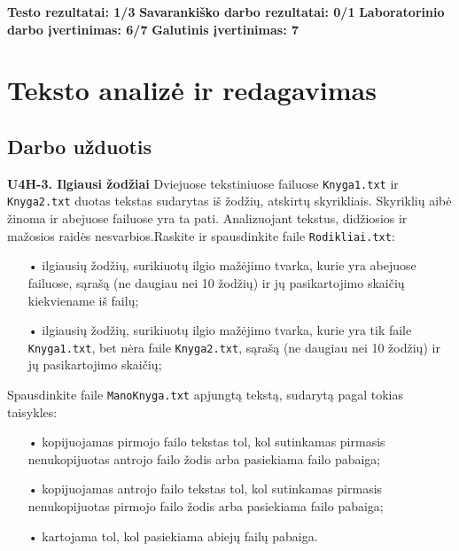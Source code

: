 \documentclass{article}
\def\changemargin#1#2{\list{}{\rightmargin#2\leftmargin#1}\item[]}
\begin{document}
\changemargin{0cm}{0cm}\textbf{Testo rezultatai: 1/3}\newline
\textbf{Savarankiško darbo rezultatai: 0/1}\newline
\textbf{Laboratorinio darbo įvertinimas: 6/7}\newline
\textbf{Galutinis įvertinimas: 7}\newline

\newpage


\section{Teksto analizė ir redagavimas}
\subsection{Darbo užduotis}
\textbf{U4H-3. Ilgiausi žodžiai}\newline
Dviejuose  tekstiniuose  failuose \texttt{Knyga1.txt} ir \texttt{Knyga2.txt} duotas tekstas sudarytas iš žodžių,
atskirtų skyrikliais. Skyriklių aibė žinoma ir abejuose failuose yra ta pati. Analizuojant tekstus, didžiosios
ir mažosios raidės nesvarbios.\vspace{0.25cm}\newline Raskite ir spausdinkite faile \texttt{Rodikliai.txt}:
\begin{itemize}
    \item[•]ilgiausių žodžių, surikiuotų ilgio mažėjimo tvarka, kurie yra abejuose failuose, sąrašą (ne daugiau nei 10 žodžių) ir jų pasikartojimo skaičių kiekviename iš failų;
    \item[•]ilgiausių žodžių, surikiuotų ilgio mažėjimo tvarka, kurie yra tik faile \texttt{Knyga1.txt}, bet nėra faile \texttt{Knyga2.txt}, sąrašą (ne daugiau nei 10 žodžių) ir jų pasikartojimo skaičių;
\end{itemize}
Spausdinkite faile \texttt{ManoKnyga.txt} apjungtą tekstą, sudarytą pagal tokias taisykles:
\begin{itemize}
    \item[•]kopijuojamas  pirmojo  failo  tekstas  tol,  kol  sutinkamas pirmasis nenukopijuotas antrojo failo žodis arba pasiekiama failo pabaiga;
    \item[•]kopijuojamas antrojo failo tekstas tol, kol sutinkamas pirmasis nenukopijuotas pirmojo failo žodis arba pasiekiama failo pabaiga;
    \item[•]kartojama tol, kol pasiekiama abiejų failų pabaiga.
\end{itemize}
\end{document}
